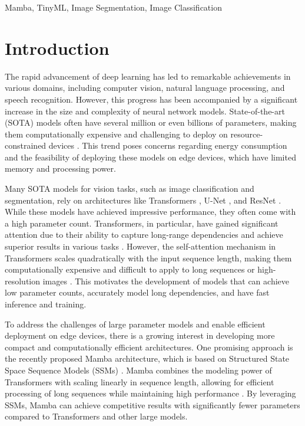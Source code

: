 \documentclass[conference]{IEEEtran}
\begin{document}
\begin{IEEEkeywords}
    Mamba, TinyML, Image Segmentation, Image Classification
\end{IEEEkeywords}

\section{Introduction}
The rapid advancement of deep learning has led to remarkable achievements in various domains, including computer vision, natural language processing, and speech recognition. However, this progress has been accompanied by a significant increase in the size and complexity of neural network models. State-of-the-art (SOTA) models often have several million or even billions of parameters, making them computationally expensive and challenging to deploy on resource-constrained devices \cite{brown2020language, dosovitskiy2021image}. This trend poses concerns regarding energy consumption and the feasibility of deploying these models on edge devices, which have limited memory and processing power.

Many SOTA models for vision tasks, such as image classification and segmentation, rely on architectures like Transformers \cite{dosovitskiy2021image}, U-Net \cite{ronneberger2015unet}, and ResNet \cite{he2016deep}. While these models have achieved impressive performance, they often come with a high parameter count. Transformers, in particular, have gained significant attention due to their ability to capture long-range dependencies and achieve superior results in various tasks \cite{vaswani2017attention}. However, the self-attention mechanism in Transformers scales quadratically with the input sequence length, making them computationally expensive and difficult to apply to long sequences or high-resolution images \cite{choromanski2020rethinking}. This motivates the development of models that can achieve low parameter counts, accurately model long dependencies, and have fast inference and training.

To address the challenges of large parameter models and enable efficient deployment on edge devices, there is a growing interest in developing more compact and computationally efficient architectures. One promising approach is the recently proposed Mamba architecture, which is based on Structured State Space Sequence Models (SSMs) \cite{gu2022efficiently}. Mamba combines the modeling power of Transformers with scaling linearly in sequence length, allowing for efficient processing of long sequences while maintaining high performance \cite{gu2023mamba}. By leveraging SSMs, Mamba can achieve competitive results with significantly fewer parameters compared to Transformers and other large models.
\end{document}
